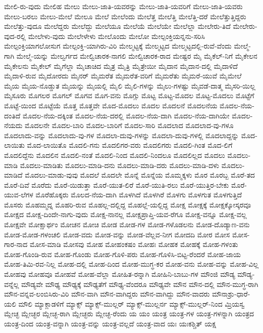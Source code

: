 {ಮೇಲಿ-ರು-ವುದು
ಮೇಲಿಹ
ಮೇಲು
ಮೇಲು-ಜಾತಿ-ಯವರನ್ನು
ಮೇಲು-ಜಾತಿ-ಯವರಿಗೆ
ಮೇಲು-ಜಾತಿ-ಯವರು
ಮೇಲು-ಬರಲು
ಮೇಲು-ಮೇಲೆ
ಮೇಲೂ
ಮೇಲೆ
ಮೇಲೆಂದು
ಮೇಲೆತ್ತ
ಮೇಲೆತ್ತಿ
ಮೇಲೆತ್ತಿ-ದರೆ
ಮೇಲೆತ್ತುತ್ತಿದ್ದರು
ಮೇಲೆತ್ತು-ವುದೂ
ಮೇಲೆದ್ದರು
ಮೇಲೆದ್ದು
ಮೇಲೆಯೂ
ಮೇಲೆಯೆ
ಮೇಲೆಯೇ
ಮೇಲೆಲ್ಲಾ
ಮೇಲೇರು-ತಿದೆ
ಮೇಲೇರು-ವುದ-ರಲ್ಲಿ
ಮೇಲೇಳು-ವುದು
ಮೇಲೇಳೇಳು
ಮೇಲೊಂದು
ಮೇಲೋ
ಮೇಲ್ಪಂಕ್ತಿಯನ್ನನು-ಸರಿಸಿ
ಮೇಲ್ಪಂಕ್ತಿಯಾಗಲೋಸುಗ
ಮೇಲ್ಪಂಕ್ತಿ-ಯಾಗಿರು-ವಿರಿ
ಮೇಲ್ಮಟ್ಟಕ್ಕೆ
ಮೇಲ್ಮಟ್ಟದ
ಮೇಲ್ಮಟ್ಟದಲ್ಲಿ-ರುವೆ-ವೆಂದು
ಮೇಲ್ಮೆ-ಗಾಗಿ
ಮೇಲ್ಮೆ-ಯನ್ನು
ಮೇಲ್ವರ್ಗದ
ಮೇಲ್ವಿಚಾರಕ-ನಾಗಲಿ
ಮೇಲ್ವಿಚಾರಕ-ರಾದ
ಮೇಷ್ಟರ
ಮೈ
ಮೈಕೆಲ್-ನಿಗೆ
ಮೈಕೇಲನ
ಮೈಕೇಲನು
ಮೈಕೇಲ್
ಮೈಗೆಲ್ಲಾ
ಮೈಚಾಚಿದ
ಮೈತ್ರ
ಮೈತ್ರಿ
ಮೈತ್ರೇಯೀ
ಮೈದಾನ
ಮೈದಾನ-ದಲ್ಲಿ
ಮೈದಾಳಿದೆ
ಮೈದಾಳಿ-ರುವ
ಮೈದೋರದು
ಮೈನರ್
ಮೈಮರೆತ
ಮೈಮರೆತ-ವರಿಗೆ
ಮೈಮರೆತು
ಮೈಮರೆ-ಯುವೆ
ಮೈಮೇಲೆ
ಮೈಯ
ಮೈಯ-ನೊಡ್ಡುತ
ಮೈಯನ್ನು
ಮೈಯಲ್ಲಿ
ಮೈಲಿ
ಮೈಲಿ-ಗಳನ್ನು
ಮೈಲು-ಗಳಷ್ಟು
ಮೈವಡೆ-ದಾತ್ಮ
ಮೈಸರಿ-ಯಿಲ್ಲ
ಮೈಸೂರು
ಮೊಗಲರ
ಮೊಗಲ್
ಮೊಗವ
ಮೊಗ-ವನು
ಮೊಗ್ಗು
ಮೊಟ್ಟ
ಮೊಟ್ಟ-ಮೊದಲ
ಮೊಟ್ಟ-ಮೊದಲು
ಮೊಟ್ಟೆಗೆ
ಮೊಟ್ಟೆ-ಯಿಂದ
ಮೊಟ್ಟೆಯೆ
ಮೊತ್ತ
ಮೊತ್ತವೇ
ಮೊದ-ಮೊದಲು
ಮೊದಲ
ಮೊದಲನೆ
ಮೊದಲನೆಯ
ಮೊದಲ-ನೆಯ-ದಂತಿದೆ
ಮೊದಲ-ನೆಯ-ದಕ್ಕಿಂತ
ಮೊದಲ-ನೆಯ-ದರಲ್ಲಿ
ಮೊದಲ-ನೆಯ-ದಾಗಿ
ಮೊದಲ-ನೆಯ-ದಾಗಿಯೇ
ಮೊದಲ-ನೆಯದು
ಮೊದಲನೇ
ಮೊದಲ-ಬಾರಿ
ಮೊದಲ-ಬಾರಿಗೆ
ಮೊದಲ-ಸಾರಿ
ಮೊದಲಾದ
ಮೊದಲಾದ-ವು-ಗಳೂ
ಮೊದಲಾದು-ವನ್ನು
ಮೊದಲಾದು-ವು-ಗಳ
ಮೊದಲಾ-ದುವು-ಗಳನ್ನು
ಮೊದಲಾ-ದುವು-ಗಳಲ್ಲಿ
ಮೊದಲಾದ್ದನ್ನು
ಮೊದ-ಲಾಯಿತು
ಮೊದ-ಲಾಯಿತೊ
ಮೊದಲಿ-ಗನು
ಮೊದಲಿಗರ-ವರು
ಮೊದಲಿಗರು
ಮೊದಲಿ-ಗಿಂತ
ಮೊದ-ಲಿಗೆ
ಮೊದಲಿದ್ದೆನು
ಮೊದಲಿನ
ಮೊದಲಿ-ನಂತೆ
ಮೊದಲಿ-ನಿಂದ
ಮೊದಲಿ-ನಿಂದಲೂ
ಮೊದಲಿಲ್ಲದ
ಮೊದಲು
ಮೊದಲು-ಮಾಡಿ
ಮೊದಲು-ಮಾಡಿತು
ಮೊದಲು-ಮಾಡಿ-ದನು
ಮೊದಲು-ಮಾಡಿ-ದರು
ಮೊದಲು-ಮಾಡಿ-ದಳು
ಮೊದಲು-ಮಾಡಿದೆ
ಮೊದಲು-ಮಾಡು-ವುವು
ಮೊದಲೆ
ಮೊದಲೇ
ಮೊನ್ನೆ
ಮೊನ್ನೆಯ
ಮೊಮ್ಮಕ್ಕಳು
ಮೊರ
ಮೊರಬ್ಬ
ಮೊರೆ-ತದ
ಮೊರೆ-ದಿವೆ
ಮೊರೆದು
ಮೊರೆ-ಯಿಡುತ್ತಾ
ಮೊರೆ-ಯುತ-ಲಿರೆ
ಮೊರೆ-ಯುತಿ-ರಲು
ಮೊರೆ-ಯುತ್ತಿರ-ಬೇಕು
ಮೊರೆ-ಯುವ-ಲೆಗಳ
ಮೊರೆಹೊಕ್ಕರು
ಮೊಲದ-ನೆಯ-ದಾಗಿ
ಮೊಳಗಿದೆ
ಮೊಳಗಿರೆ
ಮೊಳಗು
ಮೊಳಗುತ
ಮೊಳಗುತ್ತಿದೆ
ಮೊಸರು
ಮೊಹಮ್ಮದ್ನ
ಮೊಹರಿ-ರುವ
ಮೊಹಲ್ಲ-ದಲ್ಲಿದ್ದ
ಮೊಹಲ್ಲೆ-ಯಲ್ಲಿದ್ದ
ಮೋಕ್ಷ
ಮೋಕ್ಷಕ್ಕೆ
ಮೋಕ್ಷಕ್ಕೋಸ್ಕರವೂ
ಮೋಕ್ಷದ
ಮೋಕ್ಷ-ದಿಂದೇ-ನಾಗು-ವುದು
ಮೋಕ್ಷ-ನಾನಲ್ಲ
ಮೋಕ್ಷಪ್ರಾಪ್ತಿ-ಯವ-ರೆಗೂ
ಮೋಕ್ಷ-ವನ್ನೂ
ಮೋಕ್ಷ-ವಲ್ಲ
ಮೋಕ್ಷವೇ
ಮೋಕ್ಷಾರ್ಥಂ
ಮೋಚನ
ಮೋಚಿ
ಮೋಡ
ಮೋಡ-ಗಳ
ಮೋಡ-ಗಳೊಡಲನು
ಮೋಡ-ದೊಡ್ಯಾಣ-ವನು
ಮೋಡ-ಮೋಡ-ಗಳಂಚಲಿ
ಮೋಡ-ವದು
ಮೋಡ-ವನ್ನು
ಮೋಡ-ವೆಲ್ಲವ-ನೀಗ
ಮೋದದಿ
ಮೋರ
ಮೋಸ
ಮೋಸ-ಗಾರ-ನಾದ
ಮೋಸ-ಮಾಡಿ
ಮೋಸವು
ಮೋಹ
ಮೋಹಂಕಷಂ
ಮೋಹಃ
ಮೋಹಕ
ಮೋಹಕ್ಕೆ
ಮೋಹ-ಗಳಂತು
ಮೋಹ-ಗೊಂಡಿ-ರುವ
ಮೋಹ-ಗೊಂಡು
ಮೋಹ-ಗೊಳಿ-ಪರು
ಮೋಹ-ಗೊಳಿಸಿ-ಬಿಟ್ಟ-ರೆಂದರೆ
ಮೋಹ-ಜಾಯ
ಮೋಹ-ತಿಮಿ-ರವ-ನಿಲ್ಲ
ಮೋಹ-ದಲ್ಲಿ
ಮೋಹ-ದಿಂದ
ಮೋಹ-ಮುಗ್ಧ-ಕರ
ಮೋಹ-ವನು
ಮೋಹ-ವನ್ನು
ಮೋಹ-ವಿಲ್ಲ
ಮೋಹವು
ಮೋಹವೂ
ಮೋಹವೆ
ಮೋಹ-ವೆಲ್ಲಾ
ಮೋಹಿತ-ರನ್ನಾಗಿ
ಮೋಹಿನಿ-ಬಾಬು-ಗಳ
ಮೌಂಜಿ
ಮೌಡ್ಯ
ಮೌಡ್ಯ-ವನ್ನೆಲ್ಲ
ಮೌಡ್ಯವೇ
ಮೌಢ್ಯ
ಮೌಢ್ಯಕ್ಕೆ
ಮೌಢ್ಯತೆಗೆ
ಮೌಢ್ಯ-ವೆಂದರೂ
ಮೌಢ್ಯವೇ
ಮೌನ
ಮೌನ-ದಲ್ಲಿ
ಮೌನ-ಮುಗ್ಧ-ರಾಗಿ
ಮೌನ-ವನ್ನವ-ಲಂಬಿಸಿರು-ವಿರಿ
ಮೌನ-ವಾಗಿ
ಮೌನ-ವಾಗಿದ್ದರು
ಮೌನ-ವಾಗಿದ್ದು
ಮೌನ-ವಾದರು
ಮೌನಾಶ್ರು-ಧಾರೆ-ಯಲಿ
ಮೌಲಿ
ಮ್ಯಾಕ್ಲಾಡಳಿಗೆ
ಮ್ಯಾಕ್ಸ್
ಮ್ಯಾಕ್ಸ್-ಮುಲ್ಲರ್
ಮ್ಯಾಕ್ಸ್-ಮುಲ್ಲರ್ನ
ಮ್ಯಾಕ್ಸ್-ಮುಲ್ಲರ್-ನಿಂದ
ಮ್ರಿಯಸ್ವ
ಮ್ಲೇಚ್ಛ
ಮ್ಲೇಚ್ಛರ
ಮ್ಲೇಚ್ಛ-ರಾಗಿ
ಮ್ಲೇಚ್ಛರು
ಮ್ಲೇಚ್ಛ-ರೆಂದು
ಯ
ಯಂ
ಯಂತ್ರ
ಯಂತ್ರ-ಗಳ
ಯಂತ್ರ-ಗಳನ್ನಾಗಿ
ಯಂತ್ರದ
ಯಂತ್ರ-ದಿಂದ
ಯಂತ್ರ-ವನ್ನಾಗಿ
ಯಂತ್ರ-ವನ್ನು
ಯಂತ್ರ-ವಲ್ಲದೆ
ಯಂತ್ರ-ವಾದ
ಯಃ
ಯಃಕಶ್ಚಿತ್
ಯಕ್ಷ
}
